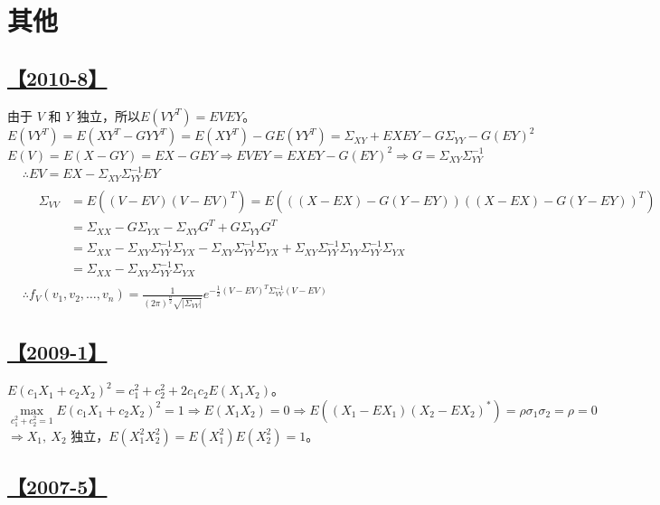 \section{其他}

\subsection{\hyperref[Q2010-8]{【2010-8】}}\label{A2010-8}

由于 $V$ 和 $Y$ 独立，所以$E(VY^T)=EVEY$。
$$
E(VY^T)=E(XY^T-GYY^T)=E(XY^T)-GE(YY^T)=\Sigma_{XY}+EXEY-G\Sigma_{YY}-G(EY)^2
$$
$$
E(V)=E(X-GY)=EX-GEY\Rightarrow EVEY=EXEY-G(EY)^2\Rightarrow G=\Sigma_{XY}\Sigma_{YY}^{-1}
$$
\begin{equation}\tag*{}
\begin{split}&
\therefore EV=EX-\Sigma_{XY}\Sigma_{YY}^{-1}EY\\
&\ \ \ \ \begin{split}
\Sigma_{VV}&=E((V-EV)(V-EV)^T)=E(((X-EX)-G(Y-EY))((X-EX)-G(Y-EY))^T)\\
&=\Sigma_{XX}-G\Sigma_{YX}-\Sigma_{XY}G^T+G\Sigma_{YY}G^T\\
&=\Sigma_{XX}-\Sigma_{XY}\Sigma_{YY}^{-1}\Sigma_{YX}-\Sigma_{XY}\Sigma_{YY}^{-1}\Sigma_{YX}+\Sigma_{XY}\Sigma_{YY}^{-1}\Sigma_{YY}\Sigma_{YY}^{-1}\Sigma_{YX}\\
&=\Sigma_{XX}-\Sigma_{XY}\Sigma_{YY}^{-1}\Sigma_{YX}\end{split}\\
&\therefore f_V(v_1, v_2, \dots, v_n)=\frac{1}{(2\pi)^{\frac{n}{2}}\sqrt{|\Sigma_{VV}|}}e^{-\frac{1}{2}(V-EV)^T\Sigma_{VV}^{-1}(V-EV)}
\end{split}
\end{equation}

\subsection{\hyperref[Q2009-1]{【2009-1】}}\label{A2009-1}

$E(c_1X_1+c_2X_2)^2=c_1^2+c_2^2+2c_1c_2E(X_1X_2)$。
$$
\max_{c_1^2+c_2^2=1}E(c_1X_1+c_2X_2)^2=1\Rightarrow E(X_1X_2)=0 \Rightarrow E((X_1-EX_1)(X_2-EX_2)^*)=\rho\sigma_1\sigma_2=\rho=0
$$
$\Rightarrow X_1,\ X_2$ 独立，$E(X_1^2X_2^2)=E(X_1^2)E(X_2^2)=1$。

\subsection{\hyperref[Q2007-5]{【2007-5】}}\label{A2007-5}

